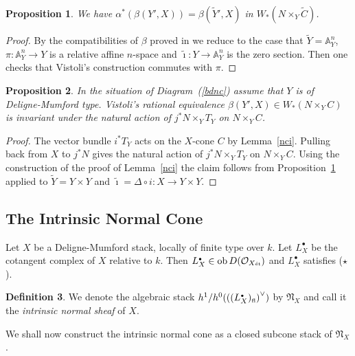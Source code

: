 \documentclass[11pt]{article}
\theoremstyle{plain}
\newtheorem{prop}{Proposition}[section]
\theoremstyle{definition}
\newtheorem{defnp}[prop]{Definition}
\newenvironment{defn}{\begin{defnp}\normalfont}{\end{defnp}}
\newenvironment{pf}{\begin{proof}}{\end{proof}}
\renewcommand{\tilde}{\widetilde}
\newcommand{\dual}[1]{{{#1}^{\vee}}}
\newcommand{\et}{{\mbox{\tiny \'{e}t}}}
\newcommand{\fl}{{\mbox{\tiny fl}}}
\newcommand{\upst}{^{\ast}}
\newcommand{\lst}{_{\ast}}
\newcommand{\com}{^{\scriptscriptstyle\bullet}}
\newcommand{\NN}{{\mathfrak{N}}}
\newcommand{\aaa}{{\mathbb{A}}}
\renewcommand{\O}{{\mathcal{O}}}
\newcommand{\ob}{\mathop{\rm ob}}
\newcommand{\comp}{\mathbin{{\scriptstyle\circ}}}
\theoremstyle{plain}
\theoremstyle{definition}
\theoremstyle{remark}
\begin{document}
\begin{prop} \label{vcgt}
We have \(\alpha\upst(\beta(Y',X))=\beta(\tilde{Y}',X)\) in
\(W\lst(N\times_Y\tilde{C})\).
\end{prop}
\begin{pf}
By the compatibilities of \(\beta\) proved in \cite{vistoli} we reduce
to the case that \(\tilde{Y}=\aaa^n_Y\), \(\pi:\aaa^n_Y\rightarrow Y\) is a
relative affine \(n\)-space and \(\tilde{\imath}:Y\to\aaa^n_Y\) is the zero
section. Then one checks that Vistoli's construction commutes with
\(\pi\).
\end{pf}

\begin{prop} \label{vrqi}
In the situation of Diagram~(\ref{bdnc}) assume that \(Y\) is of
Deligne-Mumford type. Vistoli's rational equivalence \(\beta(Y',X)\in
W\lst(N\times_YC)\) is invariant under the natural action of \(j\upst
N\times_Y T_Y\) on \(N\times_YC\).
\end{prop}
\begin{pf}
The vector bundle \(i\upst T_Y\) acts on the \(X\)-cone \(C\) by
Lemma~\ref{nci}. Pulling back from \(X\) to \(j\upst N\) gives the natural
action of \(j\upst N\times_Y T_Y\) on \(N\times_YC\). Using the
construction of the proof of Lemma~\ref{nci} the claim follows from
Proposition~\ref{vcgt} applied to \(\tilde{Y}=Y\times Y\) and
\(\tilde{\imath}=\Delta\comp i:X\to Y\times Y\).
\end{pf}

\subsection{The Intrinsic Normal Cone}

Let \(X\) be a Deligne-Mumford stack, locally of finite type over \(k\). Let
\(L_X\com\) be the cotangent complex of \(X\) relative to \(k\). Then \(L_X\com\in\ob
D(\O_{X\et})\) and \(L_X\com\) satisfies (\(\star\)).

\begin{defn}
We denote the algebraic stack
\(h^1/h^0(\dual{((L_X\com)_\fl)})\) by \(\NN_X\) and call it the {\em
intrinsic normal sheaf }of \(X\).
\end{defn}

We shall now construct the intrinsic normal cone as a closed subcone
stack of \(\NN_X\).
\end{document}
